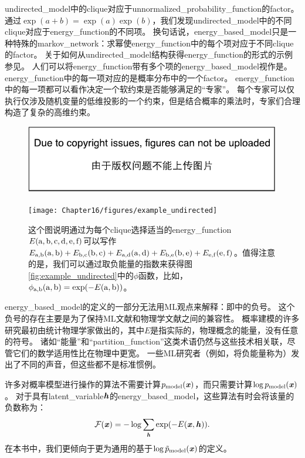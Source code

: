 \gls{undirected_model}中的\gls{clique}对应于\gls{unnormalized_probability_function}的\gls{factor}。 
通过$\exp(a+b) = \exp(a) \exp(b)$，我们发现\gls{undirected_model}中的不同\gls{clique}对应于\gls{energy_function}的不同项。
换句话说，\gls{energy_based_model}只是一种特殊的\gls{markov_network}：求幂使\gls{energy_function}中的每个项对应于不同\gls{clique}的\gls{factor}。
关于如何从\gls{undirected_model}结构获得\gls{energy_function}的形式的示例参见。
人们可以将\gls{energy_function}带有多个项的\gls{energy_based_model}视作是\citep{Hinton99}。
\gls{energy_function}中的每一项对应的是概率分布中的一个\gls{factor}。
\gls{energy_function}中的每一项都可以看作决定一个软约束是否能够满足的``专家''。
每个专家可以仅执行仅涉及随机变量的低维投影的一个约束，但是结合概率的乘法时，专家们合理构造了复杂的高维约束。
\begin{figure}[!htb]
\ifOpenSource
\centerline{\includegraphics{figure.pdf}}
\else
	\centerline{\texttt{[image: Chapter16/figures/example\_undirected]}}
\fi
	\caption{这个图说明通过为每个\gls{clique}选择适当的\gls{energy_function}$E(\mathrm{a},\mathrm{b},\mathrm{c},\mathrm{d},\mathrm{e},\mathrm{f})$可以写作$E_{\mathrm{a},\mathrm{b}}(\mathrm{a},\mathrm{b}) + E_{\mathrm{b},\mathrm{c}}(\mathrm{b},\mathrm{c}) + E_{\mathrm{a},\mathrm{d}}(\mathrm{a},\mathrm{d})+  E_{\mathrm{b},\mathrm{e}}(\mathrm{b},\mathrm{e}) + E_{\mathrm{e},\mathrm{f}}(\mathrm{e},\mathrm{f})$。值得注意的是，我们可以通过取负能量的指数来获得图\ref{fig:example_undirected}中的$\phi$函数，比如，$\phi_{\mathrm{a},\mathrm{b}}(\mathrm{a},\mathrm{b}) = \exp(-E(\mathrm{a},\mathrm{b}))$。}
	\label{fig:example_undirected_2}
\end{figure}



\gls{energy_based_model}的定义的一部分无法用\gls{ML}观点来解释：即中的负号。
这个负号的存在主要是为了保持\gls{ML}文献和物理学文献之间的兼容性。
概率建模的许多研究最初由统计物理学家做出的，其中$E$是指实际的，物理概念的能量，没有任意的符号。
诸如``能量''和``\gls{partition_function}''这类术语仍然与这些技术相关联，尽管它们的数学适用性比在物理中更宽。
一些\gls{ML}研究者（例如，\citep{Smolensky86}将负能量称为）发出了不同的声音，但这些都不是标准惯例。


许多对概率模型进行操作的算法不需要计算$p_{\text{model}}(\boldsymbol{\mathit{x}})$，而只需要计算$\log p_{\text{model}}(\boldsymbol{\mathit{x}})$。
对于具有\gls{latent_variable}$\boldsymbol{\mathit{h}}$的\gls{energy_based_model}，这些算法有时会将该量的负数称为：
\begin{align}
\label{eqn:168}
\mathcal{F} (\boldsymbol{\mathit{x}}) = -\log \sum_{\boldsymbol{\mathit{h}}} \exp(-E(\boldsymbol{\mathit{x}},\boldsymbol{\mathit{h}})).
\end{align}
在本书中，我们更倾向于更为通用的基于$\log \tilde{p}_{\text{model}}(\boldsymbol{\mathit{x}})$的定义。


